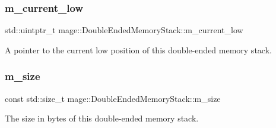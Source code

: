 \subsubsection{\texorpdfstring{m\+\_\+current\+\_\+low}{m\_current\_low}}
{\footnotesize\ttfamily std\+::uintptr\+\_\+t mage\+::\+Double\+Ended\+Memory\+Stack\+::m\+\_\+current\+\_\+low\hspace{0.3cm}{\ttfamily [private]}}

A pointer to the current low position of this double-\/ended memory stack. \mbox{\label{classmage_1_1_double_ended_memory_stack_a6c7017157bb4effd865b22be0630f9c2}} 
\subsubsection{\texorpdfstring{m\+\_\+size}{m\_size}}
{\footnotesize\ttfamily const std\+::size\+\_\+t mage\+::\+Double\+Ended\+Memory\+Stack\+::m\+\_\+size\hspace{0.3cm}{\ttfamily [private]}}

The size in bytes of this double-\/ended memory stack. 